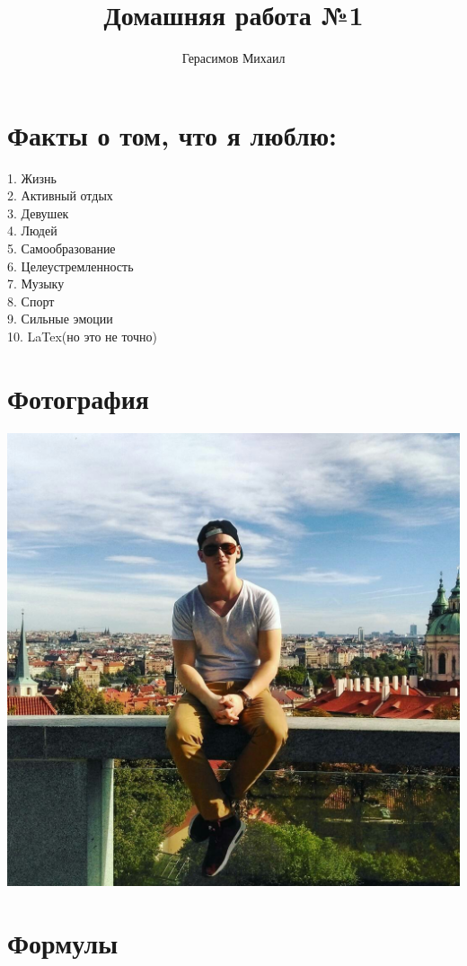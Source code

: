 \documentclass[12pt, a4paper]{article}
\title{Домашняя работа №1}
\author{Герасимов Михаил}
\date{}
\begin{document}
\maketitle

\section{Факты о том, что я люблю:}
1. Жизнь\\
2. Активный отдых\\
3. Девушек\\
4. Людей\\
5. Самообразование\\
6. Целеустремленность\\
7. Музыку\\
8. Спорт\\
9. Сильные эмоции\\
10. LaTex(но это не точно)

\section{Фотография}


\includegraphics[scale=0.4]{m}
\newpage
\section{Формулы}
\end{document}
